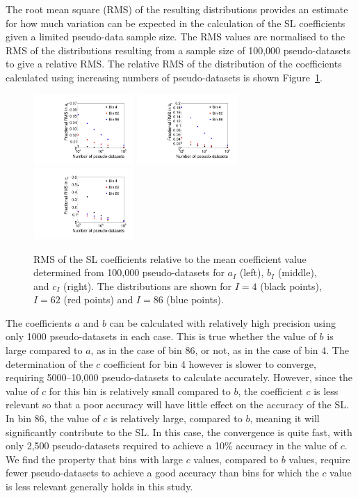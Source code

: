 \documentclass[11pt]{article}
\begin{document}
The root mean square (RMS)  of the resulting distributions provides an estimate for how much variation can be expected in the calculation 
of the SL coefficients given a limited pseudo-data sample size. 
The RMS values are normalised to the RMS of the distributions resulting from a sample size of 
100,000 pseudo-datasets to give a relative RMS. 
The relative RMS of the distribution of the 
coefficients calculated using increasing numbers of pseudo-datasets is shown Figure~\ref{fig:SLConvergence}.

\begin{figure}[t!]
  \centering
  \includegraphics[width=0.34\textwidth]{figures/varAll_A}%
  \includegraphics[width=0.34\textwidth]{figures/varAll_B}%
  \includegraphics[width=0.34\textwidth]{figures/varAll_C}
  \caption{RMS of the SL coefficients relative to the mean
    coefficient value determined from 100,000 pseudo-datasets for $a_{I}$
    (left), $b_{I}$ (middle), and $c_{I}$ (right). The distributions are shown
    for $I=4$ (black points), $I=62$ (red points) and $I=86$ (blue points).}
  \label{fig:SLConvergence}
\end{figure}

The coefficients $a$ and $b$ can be calculated with relatively high precision using only 1000 pseudo-datasets in each case. This is true 
whether the value of $b$ is large compared to $a$, as in the case of bin 86, or not, as in the case of bin 4. The determination of 
the $c$ coefficient for bin 4 
however is slower to converge, requiring 5000--10,000 pseudo-datasets to calculate accurately. However, since the value of $c$ for this bin is 
relatively small compared to $b$, the coefficient $c$ is less relevant so that a poor accuracy will have little effect on the accuracy of 
the SL. In bin 86, the value of $c$ is relatively large, compared to $b$, meaning it will significantly contribute to the SL. In this case, 
the convergence is quite fast, with only 2,500 pseudo-datasets required to achieve a 10\% accuracy in the value of $c$. We find the property 
that bins with large $c$ values, compared to $b$ values, require fewer pseudo-datasets to achieve a good accuracy than bins for which the $c$ value 
is less relevant generally holds in this study. 
\end{document}
